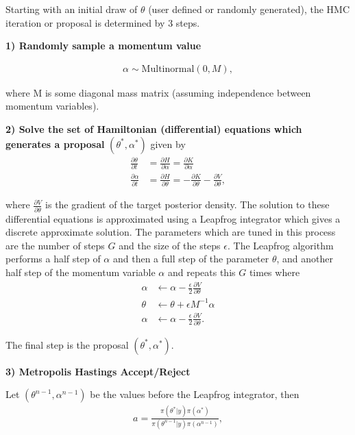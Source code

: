 \documentclass[12pt, a4paper]{article}
\begin{document}
Starting with an initial draw of $\theta$ (user defined or randomly generated), the HMC iteration or proposal is determined by 3 steps.

\textbf{1) Randomly sample a momentum value}

\begin{align}
\alpha\sim \mathrm{Multinormal}(0, M),
\end{align}

where M is some diagonal mass matrix (assuming independence between momentum variables).

\textbf{2) Solve the set of Hamiltonian (differential) equations which generates a proposal} $(\theta^{\ast}, \alpha^{\ast})$ given by
\begin{align}
\frac{\partial \theta}{\partial t} &= \frac{\partial H}{\partial \alpha} = \frac{\partial K}{\partial \alpha} \\
\frac{\partial \alpha}{\partial t} &= \frac{\partial H}{\partial \theta} = - \frac{\partial K}{\partial \theta} - \frac{\partial V}        {\partial \theta},
\end{align}

where $\frac{\partial V}{\partial \theta}$ is the gradient of the target posterior density. The solution to these differential equations is approximated using a Leapfrog integrator which gives a discrete approximate solution. The parameters which are tuned in this process are the number of steps $G$ and the size of the steps $\epsilon$. The Leapfrog algorithm performs a half step of $\alpha$ and then a full step of the parameter $\theta$, and another half step of the momentum variable $\alpha$ and repeats this $G$ times where
\begin{align}
\alpha &\leftarrow \alpha - \frac{\epsilon}{2} \frac{\partial V}{\partial \theta} \\
\theta &\leftarrow \theta + \epsilon M^{-1} \alpha \\
\alpha &\leftarrow \alpha - \frac{\epsilon}{2} \frac{\partial V}{\partial \theta}.
\end{align}

The final step is the proposal $(\theta^{\ast}, \alpha^{\ast})$.

\textbf{3) Metropolis Hastings Accept/Reject}

Let $(\theta^{n-1}, \alpha^{n-1})$ be the values before the Leapfrog integrator, then
\begin{align}
a = \frac{\pi(\theta^{\ast} | y) \pi(\alpha^{\ast})}{\pi(\theta^{n-1} | y) \pi(\alpha^{n-1})},
\end{align}
\end{document}
